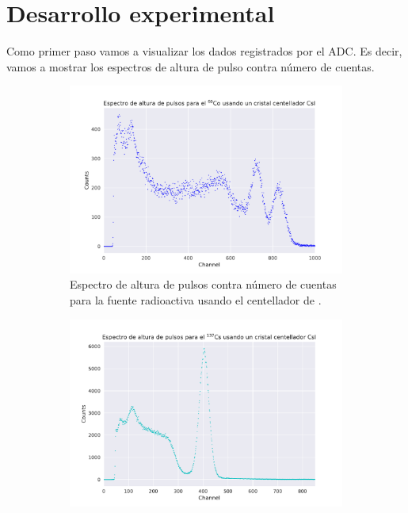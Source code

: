 \documentclass[12pt]{article}
\begin{document}
    \pagebreak
    \section*{Desarrollo experimental}
        Como primer paso vamos a visualizar los dados registrados por el ADC. Es decir, vamos a mostrar los espectros de altura de pulso contra número de cuentas.

        \begin{figure}[!htb]
            \centering
            \captionsetup[subfigure]{font=small, width=.8\linewidth}%
            \begin{subfigure}{.5\textwidth}
                \centering
                \includegraphics[width=\textwidth, trim={1cm 0 1cm 0}, clip]{height_spectrum_CsI_60Co.pdf}
                \caption{Espectro de altura de pulsos contra número de cuentas para la fuente radioactiva  usando el centellador de .}
                \label{fig:HeightPulseCoCsI}
            \end{subfigure}%
            \begin{subfigure}{.5\textwidth}
                \centering
                \includegraphics[width=\textwidth, trim={1cm 0 1cm 0}, clip]{height_spectrum_CsI_137Cs.pdf}

\end{subfigure}
\end{figure}
\end{document}
